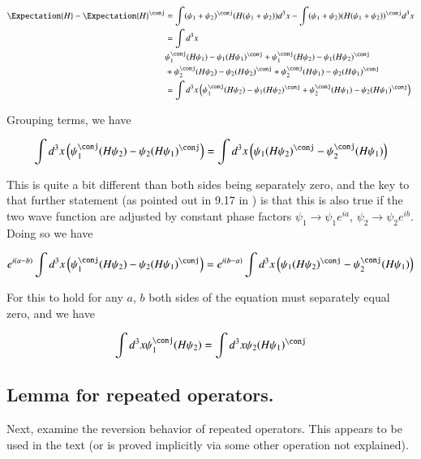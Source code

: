 \documentclass{article}
\begin{document}
\begin{align*}
\Expectation{H} - \Expectation{H}^\conj
&= \int (\psi_1 + \psi_2)^\conj (H (\psi_1 + \psi_2)) d^3 x - \int (\psi_1 + \psi_2) (H (\psi_1 + \psi_2))^\conj d^3 x \\
&= \int d^3 x \\
&\psi_1^\conj (H \psi_1) - \psi_1 (H \psi_1)^\conj 
+\psi_1^\conj (H \psi_2) - \psi_1 (H \psi_2)^\conj \\
&+\psi_2^\conj (H \psi_2) - \psi_2 (H \psi_2)^\conj 
+\psi_2^\conj (H \psi_1) - \psi_2 (H \psi_1)^\conj \\
&= \int d^3 x
\left( \psi_1^\conj (H \psi_2) - \psi_1 (H \psi_2)^\conj 
+\psi_2^\conj (H \psi_1) - \psi_2 (H \psi_1)^\conj \right) \\
\end{align*}

Grouping terms, we have 

\begin{align*}
\int d^3 x \left( \psi_1^\conj (H \psi_2) - \psi_2 (H \psi_1)^\conj \right) = \int d^3 x \left( \psi_1 (H \psi_2)^\conj - \psi_2^\conj (H \psi_1) \right)
\end{align*}

This is quite a bit different than both sides being separately zero, and the key to that further statement (as pointed out in 9.17 in \cite{bohm1989qt}) 
is that this is also true if the two wave function are adjusted by constant phase factors
$\psi_1 \rightarrow \psi_1 e^{ia}$, 
$\psi_2 \rightarrow \psi_2 e^{ib}$.  Doing so we have

\begin{align*}
e^{i(a-b)} \int d^3 x \left( \psi_1^\conj (H \psi_2) - \psi_2 (H \psi_1)^\conj \right) = e^{i(b-a)} \int d^3 x \left( \psi_1 (H \psi_2)^\conj - \psi_2^\conj (H \psi_1) \right)
\end{align*}

For this to hold for any $a$, $b$ both sides of the equation must separately equal zero, and we have

\begin{align}\label{eqn:HermitianTwo}
\int d^3 x \psi_1^\conj (H \psi_2) = \int d^3 x \psi_2 (H \psi_1)^\conj
\end{align}

\subsection{Lemma for repeated operators. }

Next, examine the reversion behavior of repeated operators.  This appears to be used in the text (or is proved implicitly via some other operation not explained).
\end{document}

